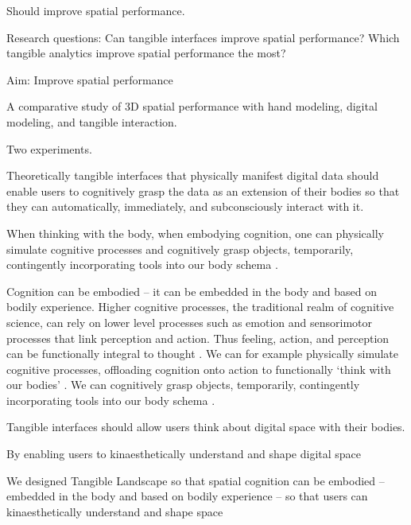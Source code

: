 Should improve spatial performance.

Research questions: 
Can tangible interfaces improve spatial performance?
Which tangible analytics improve spatial performance the most?

Aim: Improve spatial performance

A comparative study of 3D spatial performance with hand modeling, digital modeling, and tangible interaction.

Two experiments. 


















Theoretically tangible interfaces that physically manifest digital data should enable users to cognitively grasp the data as an extension of their bodies so that they can automatically, immediately, and subconsciously interact with it. 


When thinking with the body, when embodying cognition, one can physically simulate cognitive processes and cognitively grasp objects, temporarily, contingently incorporating tools into our body schema \cite{Kirsh2013}.






Cognition can be embodied -- it can be embedded in the body and based on bodily experience. 
Higher cognitive processes, the traditional realm of cognitive science, 
can rely on lower level processes such as emotion and sensorimotor processes that link perception and action. 
Thus feeling, action, and perception can be functionally integral to thought \cite{Hardy-Vallee2008}. 
We can for example physically simulate cognitive processes, offloading cognition onto action to functionally `think with our bodies' \cite{Kirsh2013}. 
We can cognitively grasp objects, temporarily, contingently incorporating tools into our body schema \cite{Kirsh2013}.

Tangible interfaces should allow users think about digital space with their bodies. 


By enabling users to kinaesthetically understand and shape digital space


We designed Tangible Landscape so that spatial cognition can be embodied -- embedded in the body and based on bodily experience -- so that users can kinaesthetically understand and shape space

